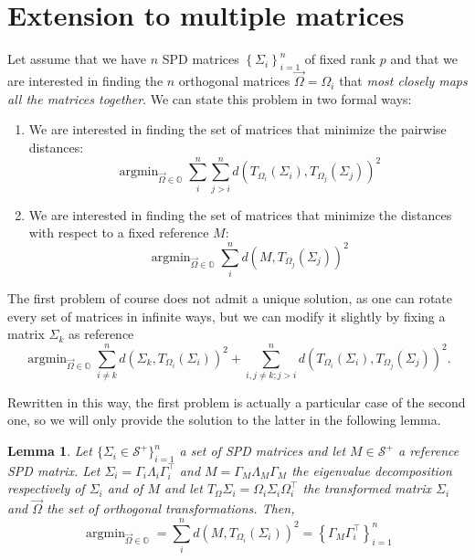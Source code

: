 \documentclass[fleqn]{article}
\theoremstyle{theorem}
\newtheorem{lemma}{Lemma}[section]
\theoremstyle{definition}
\DeclareMathOperator*{\argmin}{argmin}
\begin{document}
    \section{Extension to multiple matrices}
    Let assume that we have $n$ SPD matrices $\left\lbrace\Sigma_i\right\rbrace_{i=1}^n$ of fixed rank $p$ and that we are interested in finding the $n$ orthogonal matrices $\vec{\Omega} = \Omega_i$ that \emph{most closely maps all the matrices together}. We can state this problem in two formal ways:
    \begin{enumerate}
        \item We are interested in finding the set of matrices that minimize the pairwise distances:
        \begin{equation*}
            \argmin_{\vec\Omega\in\mathbb{O}} \sum_i^n\sum_{j>i}^nd\left(T_{\Omega_i}(\Sigma_i), T_{\Omega_j}(\Sigma_j)\right)^2
        \end{equation*}
        \item We are interested in finding the set of matrices that minimize the distances with respect to a fixed reference $M$:
        \begin{equation*}
            \argmin_{\vec\Omega\in\mathbb{O}} \sum_i^nd\left(M, T_{\Omega_j}(\Sigma_j)\right)^2
        \end{equation*}
    \end{enumerate}
    The first problem of course does not admit a unique solution, as one can rotate every set of matrices in infinite ways, but we can modify it slightly by fixing a matrix $\Sigma_k$ as reference
    \begin{equation*}
        \argmin_{\vec\Omega\in\mathbb{O}} \sum_{i\neq k}^n d\left(\Sigma_k, T_{\Omega_i}(\Sigma_i)\right)^2 + \sum_{i,j\neq k; j>i}^nd\left(T_{\Omega_i}(\Sigma_i), T_{\Omega_j}(\Sigma_j)\right)^2.
    \end{equation*}

    Rewritten in this way, the first problem is actually a particular case of the second one, so we will only provide the solution to the latter in the following lemma.
    \begin{lemma}
        Let $\lbrace\Sigma_i\in\mathcal{S}^+\rbrace_{i=1}^n$ a set of SPD matrices and let $M\in\mathcal{S}^+$ a reference SPD matrix. Let $\Sigma_i = \Gamma_i\Lambda_i\Gamma_i^\top$ and $M = \Gamma_M\Lambda_M\Gamma_M$ the eigenvalue decomposition respectively of $\Sigma_i$ and of $M$ and let $T_\Omega\Sigma_i = \Omega_i\Sigma_i\Omega_i^\top$ the transformed matrix $\Sigma_i$ and $\vec{\Omega}$ the set of orthogonal transformations. Then,
        \begin{equation}\label{eq:generalized-proc-spd}
            \argmin_{\vec\Omega\in\mathbb{O}} = \sum_i^n d(M, T_{\Omega_i}(\Sigma_i))^2 = \left\lbrace\Gamma_M\Gamma_i^\top\right\rbrace_{i=1}^n
        \end{equation}
    \end{lemma}
\end{document}
